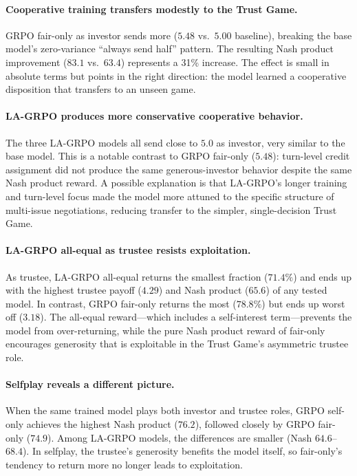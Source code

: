 \documentclass[12pt,a4paper]{article}
\begin{document}
\paragraph{Cooperative training transfers modestly to the Trust Game.} GRPO fair-only as investor sends more ($5.48$ vs.\ $5.00$ baseline), breaking the base model's zero-variance ``always send half'' pattern. The resulting Nash product improvement ($83.1$ vs.\ $63.4$) represents a 31\% increase. The effect is small in absolute terms but points in the right direction: the model learned a cooperative disposition that transfers to an unseen game.

\paragraph{LA-GRPO produces more conservative cooperative behavior.} The three LA-GRPO models all send close to $5.0$ as investor, very similar to the base model. This is a notable contrast to GRPO fair-only ($5.48$): turn-level credit assignment did not produce the same generous-investor behavior despite the same Nash product reward. A possible explanation is that LA-GRPO's longer training and turn-level focus made the model more attuned to the specific structure of multi-issue negotiations, reducing transfer to the simpler, single-decision Trust Game.

\paragraph{LA-GRPO all-equal as trustee resists exploitation.} As trustee, LA-GRPO all-equal returns the smallest fraction ($71.4\%$) and ends up with the highest trustee payoff ($4.29$) and Nash product ($65.6$) of any tested model. In contrast, GRPO fair-only returns the most ($78.8\%$) but ends up worst off ($3.18$). The all-equal reward---which includes a self-interest term---prevents the model from over-returning, while the pure Nash product reward of fair-only encourages generosity that is exploitable in the Trust Game's asymmetric trustee role.

\paragraph{Selfplay reveals a different picture.} When the same trained model plays both investor and trustee roles, GRPO self-only achieves the highest Nash product ($76.2$), followed closely by GRPO fair-only ($74.9$). Among LA-GRPO models, the differences are smaller (Nash $64.6$--$68.4$). In selfplay, the trustee's generosity benefits the model itself, so fair-only's tendency to return more no longer leads to exploitation.
\end{document}
